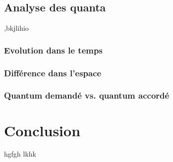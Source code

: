 \subsection{Analyse des quanta}
,bkjlihio
\subsubsection{Evolution dans le temps}
\subsubsection{Différence dans l'espace}
\subsubsection{Quantum demandé vs. quantum accordé}

\section{Conclusion}
\label{sec:demo:conclusion}
hgfgh
lkhk